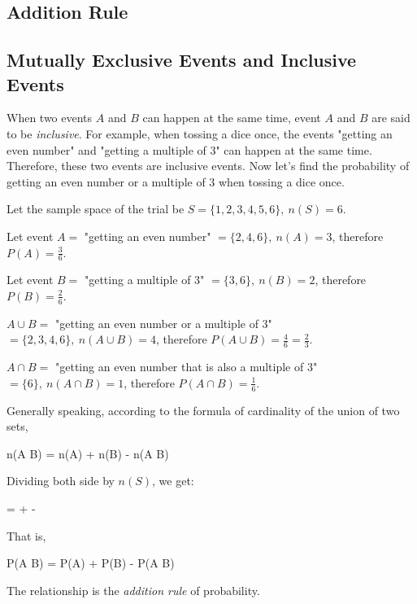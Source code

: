\documentclass{report}
\begin{document}
\begin{multicols}{2}
  \section{Addition Rule}

  \subsection*{Mutually Exclusive Events and Inclusive Events}

  When two events $A$ and $B$ can happen at the same time, event $A$ and $B$ are
  said to be \emph{inclusive}. For example, when tossing a dice once, the events
  "getting an even number" and "getting a multiple of 3" can happen at the same
  time. Therefore, these two events are inclusive events. Now let's find the
  probability of getting an even number or a multiple of 3 when tossing a dice
  once.

  \noindent Let the sample space of the trial be $S = \{1, 2, 3, 4, 5, 6\},\ n(S) = 6$.

  \noindent Let event $A = $ "getting an even number" $ = \{2, 4, 6\},\ n(A) = 3$, therefore $P(A) = \frac{3}{6}$.

  \noindent Let event $B = $ "getting a multiple of 3" $ = \{3, 6\},\ n(B) = 2$, therefore $P(B) = \frac{2}{6}$.

  \noindent $A \cup B = $ "getting an even number or a multiple of 3" $ = \{2, 3, 4, 6\},\ n(A \cup B) = 4$, therefore $P(A \cup B) = \frac{4}{6} = \frac{2}{3}$.

  \noindent $A \cap B = $ "getting an even number that is also a multiple of 3" $ = \{6\},\ n(A \cap B) = 1$, therefore $P(A \cap B) = \frac{1}{6}$.

  \noindent Generally speaking, according to the formula of cardinality of the union of two sets,
  \begin{cequation}
    n(A \cup B) = n(A) + n(B) - n(A \cap B)
  \end{cequation}
  Dividing both side by $n(S)$, we get:
  \begin{cequation}
     =  +  - 
  \end{cequation}
  That is,
  \begin{cequation}
    P(A \cup B) = P(A) + P(B) - P(A \cap B)
  \end{cequation}

  The relationship is the \emph{addition rule} of probability.


\end{multicols}
\end{document}
